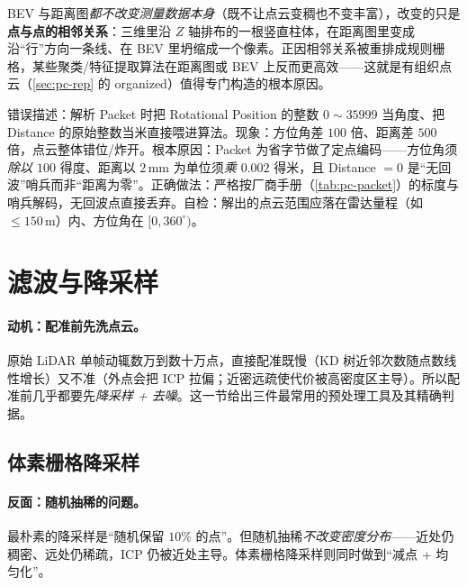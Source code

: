 \begin{insight}
BEV 与距离图\emph{都不改变测量数据本身}（既不让点云变稠也不变丰富），改变的只是\textbf{点与点的相邻关系}：三维里沿 $Z$ 轴排布的一根竖直柱体，在距离图里变成沿“行”方向一条线、在 BEV 里坍缩成一个像素。正因相邻关系被重排成规则栅格，某些聚类/特征提取算法在距离图或 BEV 上反而更高效——这就是有组织点云（\cref{sec:pc-rep} 的 organized）值得专门构造的根本原因。
\end{insight}

\begin{pitfall}
错误描述：解析 Packet 时把 Rotational Position 的整数 $0\!\sim\!35999$ 当角度、把 Distance 的原始整数当米直接喂进算法。现象：方位角差 $100$ 倍、距离差 $500$ 倍，点云整体错位/炸开。根本原因：Packet 为省字节做了定点编码——方位角须\emph{除以 $100$} 得度、距离以 $2\,\mathrm{mm}$ 为单位须\emph{乘 $0.002$} 得米，且 Distance $=0$ 是“无回波”哨兵而非“距离为零”。正确做法：严格按厂商手册（\cref{tab:pc-packet}）的标度与哨兵解码，无回波点直接丢弃。自检：解出的点云范围应落在雷达量程（如 $\le150\,\mathrm{m}$）内、方位角在 $[0,360^\circ)$。
\end{pitfall}

\section{滤波与降采样}
\label{sec:pc-filter}

\paragraph{动机：配准前先洗点云。}
原始 LiDAR 单帧动辄数万到数十万点，直接配准既慢（KD 树近邻次数随点数线性增长）又不准（外点会把 ICP 拉偏；近密远疏使代价被高密度区主导）。所以配准前几乎都要先\emph{降采样 + 去噪}。这一节给出三件最常用的预处理工具及其精确判据。

\subsection{体素栅格降采样}
\label{sec:pc-voxel}

\paragraph{反面：随机抽稀的问题。}
最朴素的降采样是“随机保留 $10\%$ 的点”。但随机抽稀\emph{不改变密度分布}——近处仍稠密、远处仍稀疏，ICP 仍被近处主导。体素栅格降采样则同时做到“减点 + 均匀化”。

